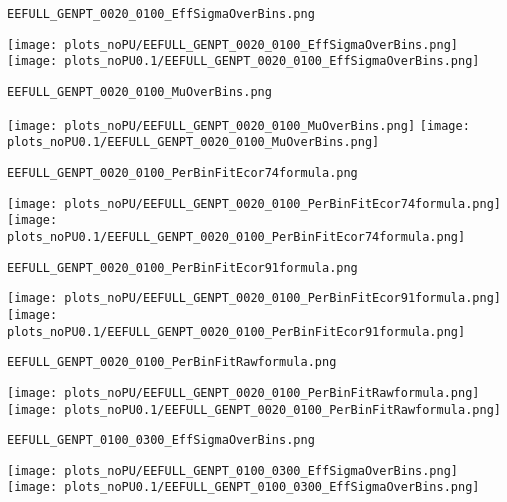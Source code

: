 \begin{frame}[fragile]
\begin{verbatim}
EEFULL_GENPT_0020_0100_EffSigmaOverBins.png
\end{verbatim}
\texttt{[image: plots\_noPU/EEFULL\_GENPT\_0020\_0100\_EffSigmaOverBins.png]}
\texttt{[image: plots\_noPU0.1/EEFULL\_GENPT\_0020\_0100\_EffSigmaOverBins.png]}
\end{frame}
\begin{frame}[fragile]
\begin{verbatim}
EEFULL_GENPT_0020_0100_MuOverBins.png
\end{verbatim}
\texttt{[image: plots\_noPU/EEFULL\_GENPT\_0020\_0100\_MuOverBins.png]}
\texttt{[image: plots\_noPU0.1/EEFULL\_GENPT\_0020\_0100\_MuOverBins.png]}
\end{frame}
\begin{frame}[fragile]
\begin{verbatim}
EEFULL_GENPT_0020_0100_PerBinFitEcor74formula.png
\end{verbatim}
\texttt{[image: plots\_noPU/EEFULL\_GENPT\_0020\_0100\_PerBinFitEcor74formula.png]}
\texttt{[image: plots\_noPU0.1/EEFULL\_GENPT\_0020\_0100\_PerBinFitEcor74formula.png]}
\end{frame}
\begin{frame}[fragile]
\begin{verbatim}
EEFULL_GENPT_0020_0100_PerBinFitEcor91formula.png
\end{verbatim}
\texttt{[image: plots\_noPU/EEFULL\_GENPT\_0020\_0100\_PerBinFitEcor91formula.png]}
\texttt{[image: plots\_noPU0.1/EEFULL\_GENPT\_0020\_0100\_PerBinFitEcor91formula.png]}
\end{frame}
\begin{frame}[fragile]
\begin{verbatim}
EEFULL_GENPT_0020_0100_PerBinFitRawformula.png
\end{verbatim}
\texttt{[image: plots\_noPU/EEFULL\_GENPT\_0020\_0100\_PerBinFitRawformula.png]}
\texttt{[image: plots\_noPU0.1/EEFULL\_GENPT\_0020\_0100\_PerBinFitRawformula.png]}
\end{frame}
\begin{frame}[fragile]
\begin{verbatim}
EEFULL_GENPT_0100_0300_EffSigmaOverBins.png
\end{verbatim}
\texttt{[image: plots\_noPU/EEFULL\_GENPT\_0100\_0300\_EffSigmaOverBins.png]}
\texttt{[image: plots\_noPU0.1/EEFULL\_GENPT\_0100\_0300\_EffSigmaOverBins.png]}
\end{frame}
